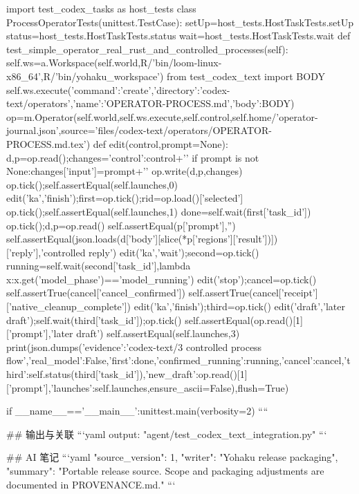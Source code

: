 import test_codex_tasks as host_tests
class ProcessOperatorTests(unittest.TestCase):
 setUp=host_tests.HostTaskTests.setUp
 status=host_tests.HostTaskTests.status
 wait=host_tests.HostTaskTests.wait
 def test_simple_operator_real_rust_and_controlled_processes(self):
  self.ws=a.Workspace(self.world,R/'bin/loom-linux-x86_64',R/'bin/yohaku_workspace')
  from test_codex_text import BODY
  self.ws.execute({'command':'create','directory':'codex-text/operators','name':'OPERATOR-PROCESS.md','body':BODY})
  op=m.Operator(self.world,self.ws.execute,self.control,self.home/'operator-journal.json',source='files/codex-text/operators/OPERATOR-PROCESS.md.tex')
  def edit(control,prompt=None):
   d,p=op.read();changes={'control':control+'\n'}
   if prompt is not None:changes['input']=prompt+'\n'
   op.write(d,p,changes)
  op.tick();self.assertEqual(self.launches,0)
  edit('ka','finish');first=op.tick();rid=op.load()['selected']
  op.tick();self.assertEqual(self.launches,1)
  done=self.wait(first['task_id'])
  op.tick();d,p=op.read()
  self.assertEqual(p['prompt'],'')
  self.assertEqual(json.loads(d['body'][slice(*p['regions']['result'])])['reply'],'controlled reply')
  edit('ka','wait');second=op.tick()
  running=self.wait(second['task_id'],lambda x:x.get('model_phase')=='model_running')
  edit('stop');cancel=op.tick()
  self.assertTrue(cancel['cancel_confirmed'])
  self.assertTrue(cancel['receipt']['native_cleanup_complete'])
  edit('ka','finish');third=op.tick()
  edit('draft','later draft');self.wait(third['task_id']);op.tick()
  self.assertEqual(op.read()[1]['prompt'],'later draft')
  self.assertEqual(self.launches,3)
  print(json.dumps({'evidence':'codex-text/3 controlled process flow','real_model':False,'first':done,'confirmed_running':running,'cancel':cancel,'third':self.status(third['task_id']),'new_draft':op.read()[1]['prompt'],'launches':self.launches},ensure_ascii=False),flush=True)

if __name__=='__main__':unittest.main(verbosity=2)
````

## 输出与关联
```yaml
output: "agent/test_codex_text_integration.py"
```

## AI 笔记
```yaml
{"source_version": 1, "writer": "Yohaku release packaging", "summary": "Portable release source. Scope and packaging adjustments are documented in PROVENANCE.md."}
```
